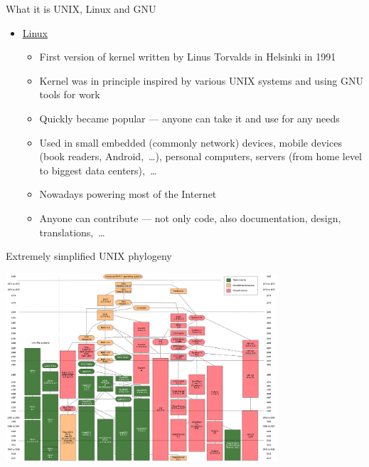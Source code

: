 \documentclass[compress, ucs, xelatex, 11pt, xcolor=svgnames,
  hyperref={
    bookmarks=true,
    unicode=true,
    colorlinks=true,
    pdftitle={Linux, command line and MetaCentrum},
    plainpages=false,
    pdfauthor={Vojtech Zeisek},
    pdfsubject={Course about use of Linux command line, writing shell scripts and using MetaCentrum of CESNET},
    pdfcreator={XeLaTeX},
    pdfkeywords={Linux, GNU, BASH, shell, command line, MetaCentrum},
    linkcolor=DarkRed,
    anchorcolor=DarkBlue,
    citecolor=Indigo,
    filecolor=NavyBlue,
    menucolor=DarkMagenta,
    urlcolor=DarkBlue,
    pdftex},
  url={hyphens, lowtilde} %
  ]{beamer}
\begin{document}
\begin{frame}[allowframebreaks]{What it is UNIX, Linux and GNU}
\begin{itemize}
\begin{itemize}
      \item Generally set of basic system tools --- working with many kernels (Linux, BSD*, Mac's Darwin,~\ldots), also present in many commercial paid UNIX systems
      \item Source code is free --- anyone can study it (Security!), report bugs, contribute, modify, share it,~\ldots
      \item GNU General Public License (GPL) --- free spirit of open-source --- license, idea, how to share software
    \end{itemize}
    \item \href{https://en.wikipedia.org/wiki/Linux}{Linux}
    \begin{itemize}
      \item First version of kernel written by Linus Torvalds in Helsinki in 1991
      \item Kernel was in principle inspired by various UNIX systems and using GNU tools for work
      \item Quickly became popular --- anyone can take it and use for any needs
      \item Used in small embedded (commonly network) devices, mobile devices (book readers, Android,~\ldots), personal computers, servers (from home level to biggest data centers),~\ldots
      \item Nowadays powering most of the Internet
      \item Anyone can contribute --- not only code, also documentation, design, translations,~\ldots
    \end{itemize}
  \end{itemize}
\end{frame}

\begin{frame}{Extremely simplified UNIX phylogeny}
  \begin{center}
    \includegraphics[height=7cm]{unix_history-simple.png}
  \end{center}
\end{frame}
\end{document}
